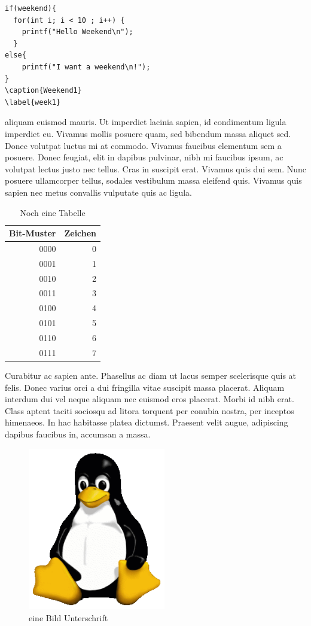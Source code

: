 \begin{lstlisting}[caption={week3},label=weekend34]
if(weekend){
  for(int i; i < 10 ; i++) {
    printf("Hello Weekend\n");
  }
else{
    printf("I want a weekend\n!");
}	
\caption{Weekend1}
\label{week1}
\end{lstlisting}

aliquam euismod mauris. Ut imperdiet lacinia sapien, id condimentum ligula imperdiet eu. Vivamus mollis posuere quam, sed bibendum massa aliquet sed. Donec volutpat luctus mi at commodo. Vivamus faucibus elementum sem a posuere. Donec feugiat, elit in dapibus pulvinar, nibh mi faucibus ipsum, ac volutpat lectus justo nec tellus. Cras in suscipit erat. Vivamus quis dui sem. Nunc posuere ullamcorper tellus, sodales vestibulum massa eleifend quis. Vivamus quis sapien nec metus convallis vulputate quis ac ligula. 

\begin{table} \centering
\begin{tabular}{|r|r|}
\hline
Bit-Muster & Zeichen \\
\hline
0000  &  0  \\
\hline
0001  &  1  \\
\hline
0010  &  2  \\
\hline
0011  &  3  \\
\hline
0100  &  4  \\
\hline
0101  &  5  \\
\hline
0110  &  6  \\
\hline
0111  &  7  \\
\hline
\end{tabular}
\caption{Noch eine Tabelle}
\label{tabloe}
\end{table}


Curabitur ac sapien ante. Phasellus ac diam ut lacus semper scelerisque quis at felis. Donec varius orci a dui fringilla vitae suscipit massa placerat. Aliquam interdum dui vel neque aliquam nec euismod eros placerat. Morbi id nibh erat. Class aptent taciti sociosqu ad litora torquent per conubia nostra, per inceptos himenaeos. In hac habitasse platea dictumst. Praesent velit augue, adipiscing dapibus faucibus in, accumsan a massa.

\begin{figure} \centering
  \includegraphics[width=6cm]{./img/tux.png}
  \caption{eine Bild Unterschrift}
  \label{tux2}
\end{figure}

